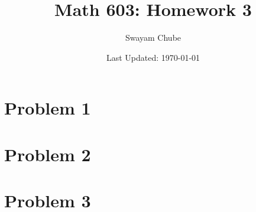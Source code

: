 \documentclass[11pt]{article}
\title{Math 603: Homework 3}
\author{Swayam Chube}
\date{Last Updated: \today}
\theoremstyle{thmstyle}
\theoremstyle{defstyle}
\begin{document}
\maketitle 

\section{Problem 1}

\section{Problem 2}

\section{Problem 3}
\end{document}
